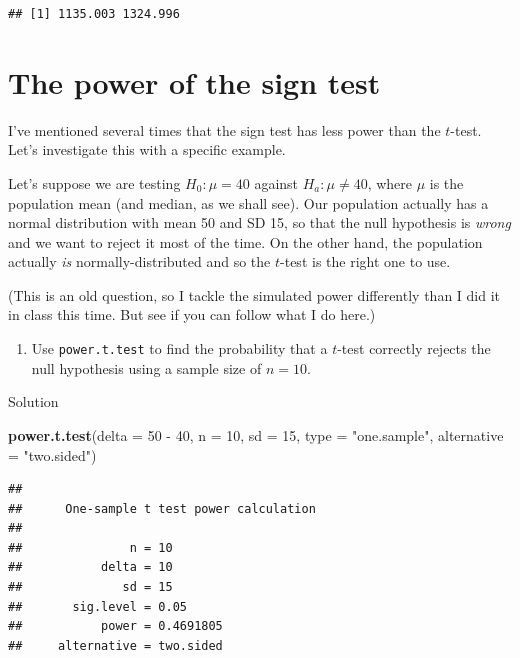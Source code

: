\documentclass[]{tufte-book}
\newenvironment{Shaded}{}{}
\newcommand{\DataTypeTok}[1]{\textcolor[rgb]{0.56,0.13,0.00}{#1}}
\newcommand{\DecValTok}[1]{\textcolor[rgb]{0.25,0.63,0.44}{#1}}
\newcommand{\KeywordTok}[1]{\textcolor[rgb]{0.00,0.44,0.13}{\textbf{#1}}}
\newcommand{\NormalTok}[1]{#1}
\newcommand{\OperatorTok}[1]{\textcolor[rgb]{0.40,0.40,0.40}{#1}}
\newcommand{\StringTok}[1]{\textcolor[rgb]{0.25,0.44,0.63}{#1}}
\providecommand{\tightlist}{%
  \setlength{\itemsep}{0pt}\setlength{\parskip}{0pt}}
\theoremstyle{definition}
\theoremstyle{definition}
\theoremstyle{definition}
\theoremstyle{remark}
\begin{document}
\begin{verbatim}
## [1] 1135.003 1324.996
\end{verbatim}

\hypertarget{the-power-of-the-sign-test}{%
\section{The power of the sign test}\label{the-power-of-the-sign-test}}

I've mentioned several times that the sign test has less power than the
\(t\)-test. Let's investigate this with a specific example.

Let's suppose we are testing \(H_0: \mu=40\) against
\(H_a: \mu \ne 40\), where \(\mu\) is the population mean (and median,
as we shall see). Our population actually has a normal distribution with
mean 50 and SD 15, so that the null hypothesis is \emph{wrong} and we
want to reject it most of the time. On the other hand, the population
actually \emph{is} normally-distributed and so the \(t\)-test is the
right one to use.

(This is an old question, so I tackle the simulated power differently
than I did it in class this time. But see if you can follow what I do
here.)

\begin{enumerate}
\def\labelenumi{(\alph{enumi})}
\tightlist
\item
  Use \texttt{power.t.test} to find the probability that a \(t\)-test
  correctly rejects the null hypothesis using a sample size of \(n=10\).
\end{enumerate}

Solution

\begin{Shaded}
\begin{Highlighting}[]
\KeywordTok{power.t.test}\NormalTok{(}\DataTypeTok{delta =} \DecValTok{50} \OperatorTok{-}\StringTok{ }\DecValTok{40}\NormalTok{, }\DataTypeTok{n =} \DecValTok{10}\NormalTok{, }\DataTypeTok{sd =} \DecValTok{15}\NormalTok{, }
    \DataTypeTok{type =} \StringTok{"one.sample"}\NormalTok{, }\DataTypeTok{alternative =} \StringTok{"two.sided"}\NormalTok{)}
\end{Highlighting}
\end{Shaded}

\begin{verbatim}
## 
##      One-sample t test power calculation 
## 
##               n = 10
##           delta = 10
##              sd = 15
##       sig.level = 0.05
##           power = 0.4691805
##     alternative = two.sided
\end{verbatim}
\end{document}
